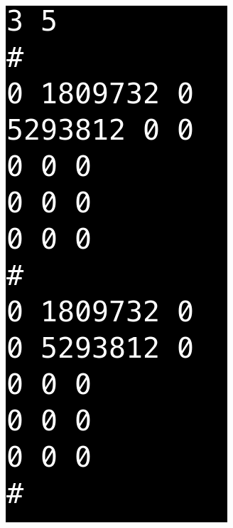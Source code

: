 \begin{figure}[ht]
    \centering
    \hspace*{\fill}
    \begin{subfigure}{0.15\textwidth}
        \centering
        \includegraphics[width=\textwidth]{img/chap2/SortieStandard.png}

\end{subfigure}
\end{figure}

